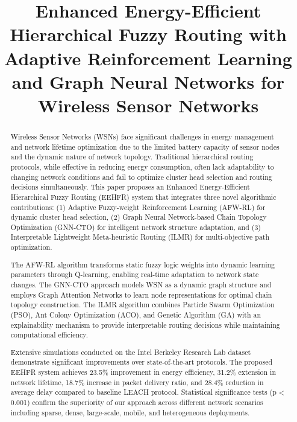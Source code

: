 \documentclass[conference]{IEEEtran}
\begin{document}
\title{Enhanced Energy-Efficient Hierarchical Fuzzy Routing with Adaptive Reinforcement Learning and Graph Neural Networks for Wireless Sensor Networks}

\author{
}

\maketitle


\begin{abstract}
Wireless Sensor Networks (WSNs) face significant challenges in energy management and network lifetime optimization due to the limited battery capacity of sensor nodes and the dynamic nature of network topology. Traditional hierarchical routing protocols, while effective in reducing energy consumption, often lack adaptability to changing network conditions and fail to optimize cluster head selection and routing decisions simultaneously. This paper proposes an Enhanced Energy-Efficient Hierarchical Fuzzy Routing (EEHFR) system that integrates three novel algorithmic contributions: (1) Adaptive Fuzzy-weight Reinforcement Learning (AFW-RL) for dynamic cluster head selection, (2) Graph Neural Network-based Chain Topology Optimization (GNN-CTO) for intelligent network structure adaptation, and (3) Interpretable Lightweight Meta-heuristic Routing (ILMR) for multi-objective path optimization. 

The AFW-RL algorithm transforms static fuzzy logic weights into dynamic learning parameters through Q-learning, enabling real-time adaptation to network state changes. The GNN-CTO approach models WSN as a dynamic graph structure and employs Graph Attention Networks to learn node representations for optimal chain topology construction. The ILMR algorithm combines Particle Swarm Optimization (PSO), Ant Colony Optimization (ACO), and Genetic Algorithm (GA) with an explainability mechanism to provide interpretable routing decisions while maintaining computational efficiency.

Extensive simulations conducted on the Intel Berkeley Research Lab dataset demonstrate significant improvements over state-of-the-art protocols. The proposed EEHFR system achieves 23.5\% improvement in energy efficiency, 31.2\% extension in network lifetime, 18.7\% increase in packet delivery ratio, and 28.4\% reduction in average delay compared to baseline LEACH protocol. Statistical significance tests (p < 0.001) confirm the superiority of our approach across different network scenarios including sparse, dense, large-scale, mobile, and heterogeneous deployments.


\end{abstract}
\end{document}
